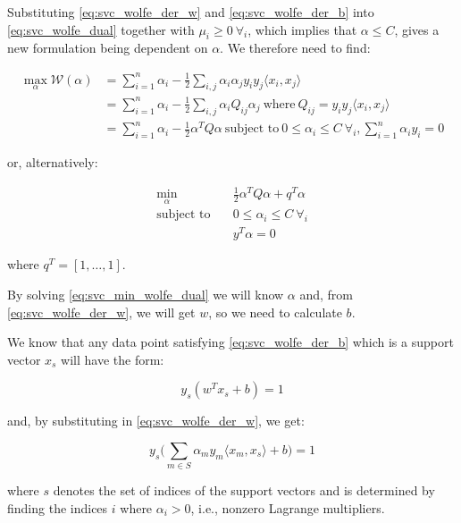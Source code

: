 Substituting \ref{eq:svc_wolfe_der_w} and \ref{eq:svc_wolfe_der_b} into \ref{eq:svc_wolfe_dual} together with $\mu_i\geq 0 \ \forall_i$, which implies that $\alpha\leq C$, gives a new formulation being dependent on $\alpha$. We therefore need to find:

\begin{align*}
    \max_{\alpha} \mathcal{W}(\alpha) &= \sum_{i=1}^{n}\alpha_i - \frac{1}{2}\sum_{i,j}\alpha_i\alpha_j y_i y_j \langle x_i, x_j \rangle \\
    &= \sum_{i=1}^{n}\alpha_i - \frac{1}{2}\sum_{i,j}\alpha_i Q_{ij}\alpha_j \ \text{where} \ Q_{ij} = y_i y_j \langle x_i, x_j \rangle \\
    &= \sum_{i=1}^{n}\alpha_i - \frac{1}{2}\alpha^T Q\alpha \ \text{subject to} \ 0\leq\alpha_i\leq C \ \forall_i, \sum_{i=1}^{n}\alpha_i y_i=0 \label{eq:svc_max_wolfe_dual}
\end{align*}

or, alternatively:

\begin{equation}
    \begin{aligned}
        \min_{\alpha} \quad & \frac{1}{2}\alpha^T Q\alpha+q^T\alpha \\
            \textrm{subject to} \quad & 0\leq\alpha_i\leq C \ \forall_i \\ & y^T\alpha=0
    \end{aligned} \label{eq:svc_min_wolfe_dual}
\end{equation}

where $q^T = [1, \dots, 1]$.

By solving \ref{eq:svc_min_wolfe_dual} we will know $\alpha$ and, from \ref{eq:svc_wolfe_der_w}, we will get $w$, so we need to calculate $b.$

We know that any data point satisfying \ref{eq:svc_wolfe_der_b} which is a support vector $x_s$ will have the form:

\begin{equation}
	y_s(w^T x_s + b)=1 \label{eq:svc_sv_const1}
\end{equation}

and, by substituting in \ref{eq:svc_wolfe_der_w}, we get:

\begin{equation}
	y_s\big(\sum_{m\in S}\alpha_m y_m \langle x_m, x_s \rangle +b\big)=1 \label{eq:svc_sv_const2}
\end{equation}

where $s$ denotes the set of indices of the support vectors and is determined by finding the indices $i$ where $\alpha_i>0$, i.e., nonzero Lagrange multipliers.

